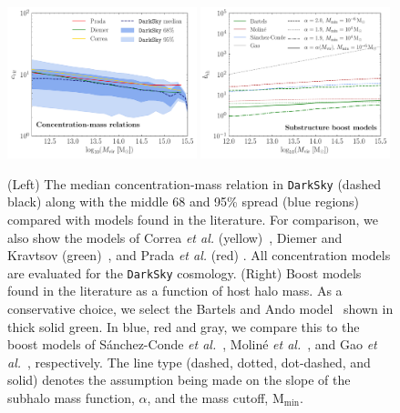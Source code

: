 \begin{figure}[t]
   \centering
  \includegraphics[width=0.49\textwidth]{ch-darksky/plots//cvir_models.pdf} 
   \includegraphics[width=0.49\textwidth]{ch-darksky/plots//boost_models.pdf} 
         \caption{(Left) The median concentration-mass relation in \texttt{DarkSky} (dashed black) along with the middle 68 and 95\% spread (blue regions) compared with models found in the literature.  For comparison, we also show the models of Correa \emph{et al.} (yellow)~\cite{Correa:2015dva}, Diemer and Kravtsov (green)~\cite{Diemer:2014gba}, and Prada \emph{et al.} (red) \cite{Prada:2011jf}.  All concentration models are evaluated for the \texttt{DarkSky} cosmology. (Right)  Boost models found in the literature as a function of host halo mass. As a conservative choice, we select the Bartels and Ando model~\cite{Bartels:2015uba} shown in thick solid green. In blue, red and gray, we compare this to the boost models of S{\'a}nchez-Conde \emph{et al.}~\cite{Sanchez-Conde:2013yxa}, Molin{\'e} \emph{et al.}~\cite{Moline:2016pbm}, and Gao \emph{et al.}~\cite{Gao:2011rf}, respectively. The line type (dashed, dotted, dot-dashed, and solid) denotes the assumption being made on the slope of the subhalo mass function, $\alpha$, and the mass cutoff, M$_\text{min}$.  }
    \label{fig:concentrations}
\end{figure}


